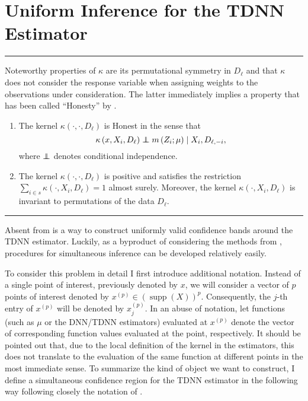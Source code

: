 \section{Uniform Inference for the TDNN Estimator}\label{sec:unif_inf}
\hrule

Noteworthy properties of $\kappa$ are its permutational symmetry in $D_{\ell}$ and that $\kappa$ does not consider the response variable when assigning weights to the observations under consideration.
The latter immediately implies a property that has been called ``Honesty'' by \citet{wager_estimation_2018}.

\begin{boxD}
	\begin{dfn}\label{Symmetry_Honesty}\mbox{}
		\begin{enumerate}
			\item The kernel $\kappa\left(\cdot, \cdot, D_{\ell}\right)$ is Honest in the sense that
				  $$\kappa\left(x, X_{i}, D_{\ell}\right) \perp\!\!\!\!\perp m\left(Z_{i} ; \mu\right) \mid X_{i}, D_{\ell,-i},$$
				  where $\perp\!\!\!\!\perp$ denotes conditional independence.
			\item The kernel $\kappa\left(\cdot, \cdot, D_{\ell}\right)$ is positive and satisfies the restriction
				  $\sum_{i \in s} \kappa\left(\cdot, X_{i}, D_{\ell}\right)=1$ almost surely.
				  Moreover, the kernel $\kappa\left(\cdot, X_{i}, D_{\ell}\right)$ is invariant to permutations of the data $D_{\ell}.$
		\end{enumerate}
	\end{dfn}
\end{boxD}

\hrule
Absent from \citet{demirkaya_optimal_2024} is a way to construct uniformly valid confidence bands around the TDNN estimator.
Luckily, as a byproduct of considering the methods from \citet{ritzwoller_simultaneous_2024}, procedures for simultaneous inference can be developed relatively easily.

To consider this problem in detail I first introduce additional notation.
Instead of a single point of interest, previously denoted by $x$, we will consider a vector of $p$ points of interest denoted by $x^{(p)} \in \left(\operatorname{supp}\left(X\right)\right)^{p}$.
Consequently, the $j$-th entry of $x^{(p)}$ will be denoted by $x^{(p)}_{j}$.
In an abuse of notation, let functions (such as $\mu$ or the DNN/TDNN estimators) evaluated at $x^{(p)}$ denote the vector of corresponding function values evaluated at the point, respectively.
It should be pointed out that, due to the local definition of the kernel in the estimators, this does not translate to the evaluation of the same function at different points in the most immediate sense.
To summarize the kind of object we want to construct, I define a simultaneous confidence region for the TDNN estimator in the following way following closely the notation of \citet{ritzwoller_simultaneous_2024}.

